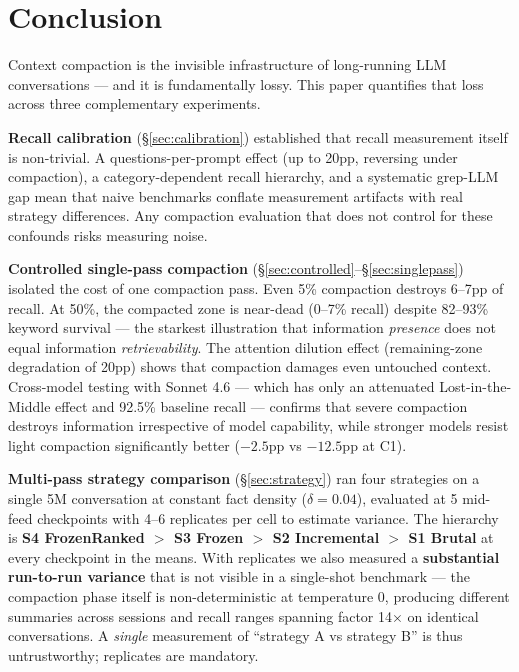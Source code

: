 \section{Conclusion}
\label{sec:conclusion}

Context compaction is the invisible infrastructure of long-running LLM
conversations --- and it is fundamentally lossy. This paper quantifies that
loss across three complementary experiments.

\textbf{Recall calibration} (\S\ref{sec:calibration}) established that recall measurement itself is
non-trivial. A questions-per-prompt effect (up to 20pp, reversing under compaction), a category-dependent recall hierarchy,
and a systematic grep-LLM gap mean that naive benchmarks conflate measurement
artifacts with real strategy differences. Any compaction evaluation that does
not control for these confounds risks measuring noise.

\textbf{Controlled single-pass compaction} (\S\ref{sec:controlled}--\S\ref{sec:singlepass}) isolated the cost of one
compaction pass. Even 5\% compaction destroys 6--7pp of recall. At 50\%, the
compacted zone is near-dead (0--7\% recall) despite 82--93\% keyword survival ---
the starkest illustration that information \textit{presence} does not equal
information \textit{retrievability}. The attention dilution effect (remaining-zone
degradation of 20pp) shows that compaction damages even untouched context.
Cross-model testing with Sonnet 4.6 --- which has only an attenuated
Lost-in-the-Middle effect and 92.5\% baseline recall --- confirms that
severe compaction destroys
information irrespective of model capability, while stronger models resist
light compaction significantly better ($-2.5$pp vs $-12.5$pp at C1).

\textbf{Multi-pass strategy comparison} (\S\ref{sec:strategy}) ran four strategies on a single 5M
conversation at constant fact density ($\delta=0.04$), evaluated at 5 mid-feed
checkpoints with 4--6 replicates per cell to estimate variance. The hierarchy
is \textbf{S4 FrozenRanked $>$ S3 Frozen $>$ S2 Incremental $>$ S1 Brutal} at every
checkpoint in the means. With replicates we also measured a \textbf{substantial
run-to-run variance} that is not visible in a single-shot benchmark --- the
compaction phase itself is non-deterministic at temperature 0, producing
different summaries across sessions and recall ranges spanning factor 14$\times$
on identical conversations. A \textit{single} measurement of ``strategy A vs
strategy B'' is thus untrustworthy; replicates are mandatory.

